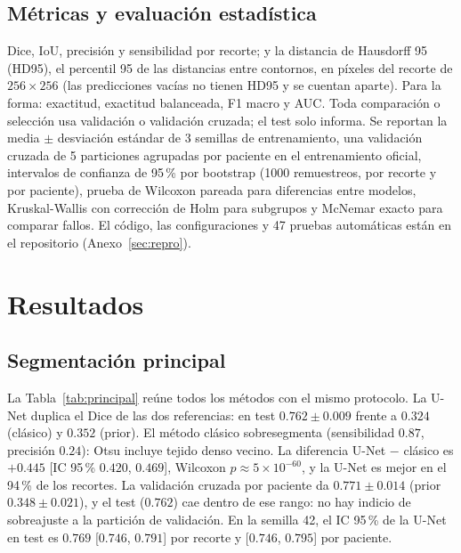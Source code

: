 \documentclass[11pt,a4paper]{article}
\begin{document}
\subsection{Métricas y evaluación estadística}
Dice, IoU, precisión y sensibilidad por recorte; y la distancia de Hausdorff 95 (HD95), el percentil 95 de las distancias entre contornos, en píxeles del recorte de $256\times256$ (las predicciones vacías no tienen HD95 y se cuentan aparte). Para la forma: exactitud, exactitud balanceada, F1 macro y AUC. Toda comparación o selección usa validación o validación cruzada; el test solo informa. Se reportan la media $\pm$ desviación estándar de 3 semillas de entrenamiento, una validación cruzada de 5 particiones agrupadas por paciente en el entrenamiento oficial, intervalos de confianza de 95\,\% por bootstrap (1000 remuestreos, por recorte y por paciente), prueba de Wilcoxon pareada para diferencias entre modelos, Kruskal-Wallis con corrección de Holm para subgrupos y McNemar exacto para comparar fallos. El código, las configuraciones y 47 pruebas automáticas están en el repositorio (Anexo~\ref{sec:repro}).

\section{Resultados}
\subsection{Segmentación principal}
La Tabla~\ref{tab:principal} reúne todos los métodos con el mismo protocolo. La U-Net duplica el Dice de las dos referencias: en test $0.762 \pm 0.009$ frente a $0.324$ (clásico) y $0.352$ (prior). El método clásico sobresegmenta (sensibilidad $0.87$, precisión $0.24$): Otsu incluye tejido denso vecino. La diferencia U-Net $-$ clásico es $+0.445$ [IC 95\,\% $0.420$, $0.469$], Wilcoxon $p\approx 5\times10^{-60}$, y la U-Net es mejor en el 94\,\% de los recortes. La validación cruzada por paciente da $0.771 \pm 0.014$ (prior $0.348 \pm 0.021$), y el test ($0.762$) cae dentro de ese rango: no hay indicio de sobreajuste a la partición de validación. En la semilla 42, el IC 95\,\% de la U-Net en test es $0.769$ [$0.746$, $0.791$] por recorte y [$0.746$, $0.795$] por paciente.
\end{document}
